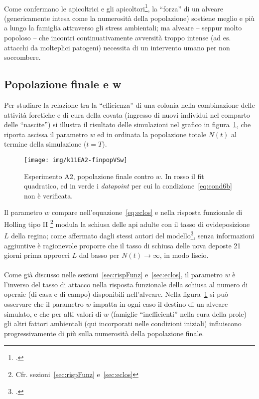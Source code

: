 \paragraph{}
Come confermano le apicoltrici e gli apicoltori\footcite{privFDL,privFPan,meccanica},
la ``forza'' di un alveare (genericamente intesa come la numerosità della popolazione)
sostiene meglio e più a lungo la famiglia attraverso gli stress ambientali;
ma alveare -- seppur molto popoloso -- che incontri continuativamente avversità troppo intense (ad es. attacchi da
molteplici patogeni) necessita di un intervento umano per non soccombere.

\subsection{Popolazione finale e w}
Per studiare la relazione tra la ``efficienza'' di una colonia nella combinazione delle attività foretiche e di
cura della covata (ingresso di nuovi individui nel comparto delle ``nascite'') si illustra il risultato delle
simulazioni nel grafico in figura~\ref{img:kh11expA23}, che riporta ascissa il parametro $w$ ed in ordinata
la popolazione totale $N(t)$ al termine della simulazione ($t=T$).
\begin{figure}[hbt]
    \centering
    \texttt{[image: img/k11EA2-finpopVSw]}

    \caption[Esperimento A2, popolazione finale contro w.]{Esperimento A2, popolazione finale contro $w$.
    In rosso il fit quadratico, ed in verde i \emph{datapoint} per cui la condizione~\eqref{eq:cond6b} non
    è verificata.}
    \label{img:kh11expA23}
\end{figure}

Il parametro $w$ compare nell'equazione~\eqref{eq:eclos} e nella risposta funzionale di Holling tipo II
\footnote{Cfr. sezioni~\ref{sec:rispFunz} e~\ref{sec:eclos}}
modula la schiusa delle api adulte con il tasso di ovideposizione $L$ della regina; come
affermato dagli stessi autori del modello\footcite[2]{khoury2011}, senza informazioni aggiuntive è ragionevole
proporre che il tasso di schiusa delle uova deposte 21 giorni prima approcci $L$ dal basso per $N(t) \to \infty$,
in modo liscio.

\paragraph{}
Come già discusso nelle sezioni~\ref{sec:rispFunz} e~\ref{sec:eclos}, il parametro $w$ è l'inverso del tasso di
attacco nella risposta funzionale della schiusa al numero di operaie (di casa e di campo) disponibili nell'alveare.
Nella figura~\ref{img:kh11expA23} si può osservare che il parametro $w$ impatta in ogni caso il destino di un
alveare simulato, e che per alti valori di $w$ (\ie famiglie ``inefficienti'' nella cura della prole) gli altri
fattori ambientali (qui incorporati nelle condizioni iniziali) influiscono progressivamente di più sulla
numerosità della popolazione finale.

